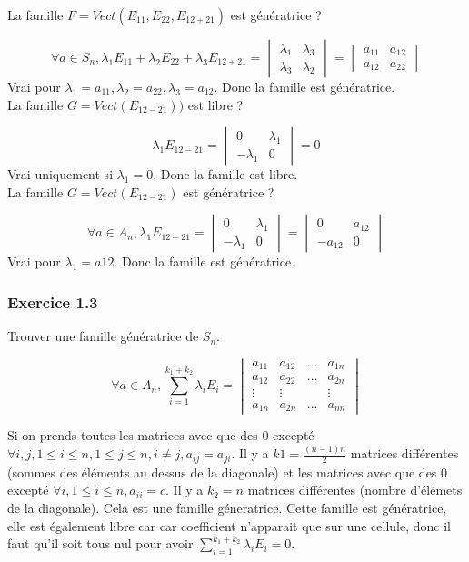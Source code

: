 \documentclass[]{book}
\theoremstyle{definition}
\begin{document}
La famille $F = Vect(E_{11},E_{22},E_{12+21})$ est g\'en\'eratrice ?
	
$$
\forall a \in S_n,
\lambda_1 E_{11} + \lambda_2 E_{22} + \lambda_3 E_{12+21} = \begin{vmatrix} \lambda_1 & \lambda_3 \\ \lambda_3  & \lambda_2 \end{vmatrix} = 
\begin{vmatrix} a_{11} & a_{12} \\ a_{12}  & a_{22} \end{vmatrix}
$$
Vrai pour $\lambda_1 = a_{11}, \lambda_2 = a_{22}, \lambda_3  = a_{12}$. Donc la famille est g\'en\'eratrice.\\


La famille $G = Vect(E_{12-21}))$ est libre ?
	
$$
\lambda_1 E_{12-21} = \begin{vmatrix} 0 & \lambda_1 \\ -\lambda_1  & 0 \end{vmatrix} = 0
$$
Vrai uniquement si $\lambda_1 = 0$. Donc la famille est libre.\\

La famille $G = Vect(E_{12-21})$ est g\'en\'eratrice ?
	
$$
\forall a \in A_n,
\lambda_1 E_{12-21} = \begin{vmatrix} 0 & \lambda_1 \\ -\lambda_1  & 0 \end{vmatrix} = 
\begin{vmatrix} 0 & a_{12} \\ -a_{12} & 0 \end{vmatrix}
$$
Vrai pour $\lambda_1 = a{12}$. Donc la famille est g\'en\'eratrice.

\subsubsection*{Exercice 1.3} 
Trouver une famille g\'en\'eratrice de $S_n$.
	
$$
\forall a \in A_n,
\sum_{i=1}^{k_1+k_2}\lambda_i E_{i} =  
\begin{vmatrix} a_{11} & a_{12} & \ldots & a_{1n} \\ a_{12} & a_{22} & \ldots & a_{2n} \\ \vdots & \vdots & & \vdots \\ a_{1n} & a_{2n} & \ldots & a_{nn} \end{vmatrix}
$$

Si on prends toutes les matrices avec que des 0 except\'e $\forall i, j, 1 \leq i \leq n, 1 \leq j \leq n, i \neq j, a_{ij} = a_{ji}$. Il y a $k1=\frac{(n-1)n}{2}$ matrices diff\'erentes (sommes des \'el\'ements au dessus de la diagonale) et les matrices avec que des 0 except\'e $\forall i, 1 \leq i \leq n, a_{ii} = c$. Il y a $k_2 = n$ matrices diff\'erentes (nombre d'\'el\'emets de la diagonale). Cela est une famille g\'eneratrice.
Cette famille est g\'en\'eratrice, elle est \'egalement libre car car coefficient n'apparait que sur une cellule, donc il faut qu'il soit tous nul pour avoir $\sum_{i=1}^{k_1+k_2}\lambda_i E_{i} =  0$.
\end{document}
